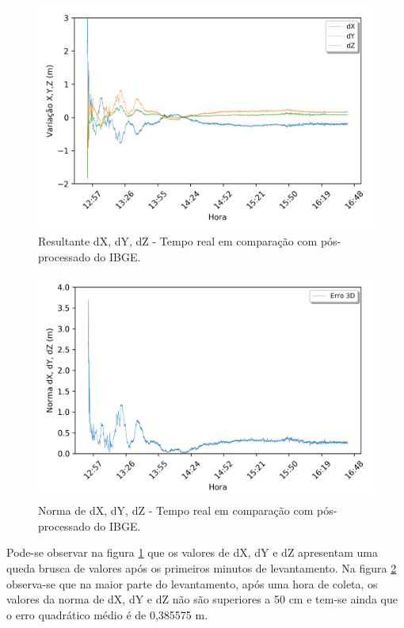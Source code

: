 \begin{figure}[H]
\centering
\includegraphics[scale=0.9]{data/Graphics/RJ_T20712/RJ_T20712_comparison_graphic_xyz.png}
\caption{Resultante dX, dY, dZ - Tempo real em comparação com pós-processado do IBGE.}
\label{comp_xyz_20712}
\end{figure}


\begin{figure}[H]
\centering
\includegraphics[scale=0.9]{data/Graphics/RJ_T20712/RJ_T20712_comparison_graphic_result.png}
\caption{Norma de dX, dY, dZ - Tempo real em comparação com pós-processado do IBGE.}
\label{comp_norma_20712}
\end{figure}

Pode-se observar na figura \ref{comp_xyz_20712} que os valores de dX, dY e dZ apresentam uma queda brusca de valores após os primeiros minutos de levantamento. Na figura \ref{comp_norma_20712} observa-se que na maior parte do levantamento, após uma hora de coleta, os valores da norma de dX, dY e dZ não são superiores a 50 cm e tem-se ainda que o erro quadrático médio é de 0,385575 m.

